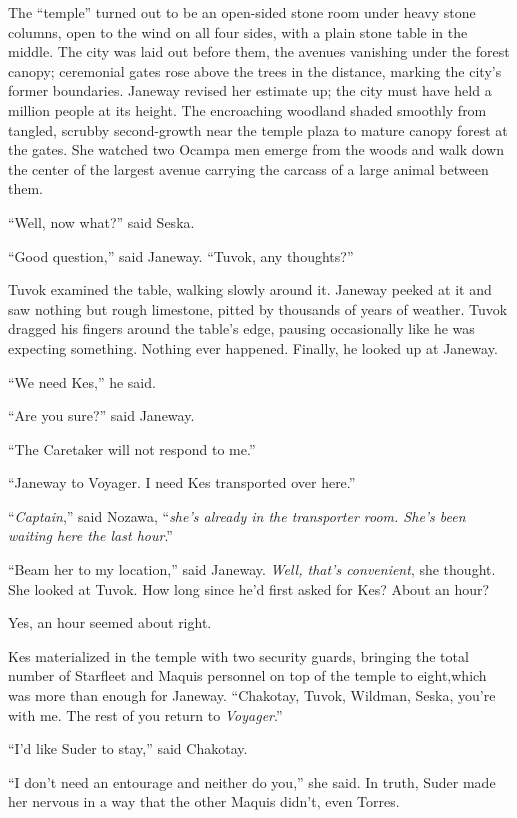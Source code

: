 \documentclass[twoside,letterpaper,12pt]{memoir}
\begin{document}
The ``temple'' turned out to be an open-sided stone room under heavy stone columns, open to the wind on all four sides, with a plain stone table in the middle. The city was laid out before them, the avenues vanishing under the forest canopy; ceremonial gates rose above the trees in the distance, marking the city’s former boundaries. Janeway revised her estimate up; the city must have held a million people at its height. The encroaching woodland shaded smoothly from tangled, scrubby second-growth near the temple plaza to mature canopy forest at the gates. She watched two Ocampa men emerge from the woods and walk down the center of the largest avenue carrying the carcass of a large animal between them. 

``Well, now what?'' said Seska. 

``Good question,'' said Janeway. ``Tuvok, any thoughts?'' 

Tuvok examined the table, walking slowly around it. Janeway peeked at it and saw nothing but rough limestone, pitted by thousands of years of weather. Tuvok dragged his fingers around the table's edge, pausing occasionally like he was expecting something. Nothing ever happened. Finally, he looked up at Janeway. 

``We need Kes,'' he said. 

``Are you sure?'' said Janeway. 

``The Caretaker will not respond to me.'' 

``Janeway to Voyager. I need Kes transported over here.'' 

``\textit{Captain},'' said Nozawa, ``\textit{she's already in the transporter room. She's been waiting here the last hour}.'' 

``Beam her to my location,'' said Janeway. \textit{Well, that's convenient}, she thought. She looked at Tuvok. How long since he'd first asked for Kes? About an hour? 

Yes, an hour seemed about right. 

Kes materialized in the temple with two security guards, bringing the total number of Starfleet and Maquis personnel on top of the temple to eight,which was more than enough for Janeway. ``Chakotay, Tuvok, Wildman, Seska, you're with me. The rest of you return to \textit{Voyager}.'' 

``I'd like Suder to stay,'' said Chakotay.

``I don't need an entourage and neither do you,'' she said. In truth, Suder made her nervous in a way that the other Maquis didn't, even Torres.
\end{document}
